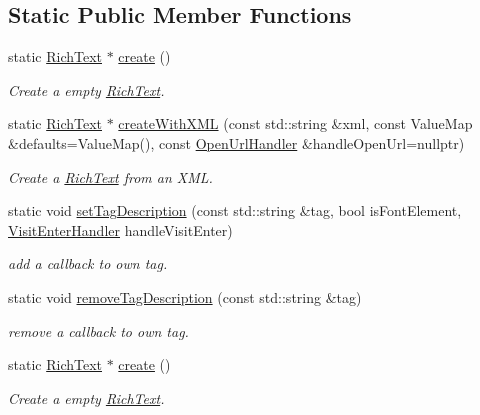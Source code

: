 \subsection*{Static Public Member Functions}
\begin{DoxyCompactItemize}
\item 
static \hyperlink{classui_1_1RichText}{Rich\+Text} $\ast$ \hyperlink{classui_1_1RichText_ae4e83215a254608fe6b26aecd224abfa}{create} ()
\begin{DoxyCompactList}\small\item\em Create a empty \hyperlink{classui_1_1RichText}{Rich\+Text}. \end{DoxyCompactList}\item 
static \hyperlink{classui_1_1RichText}{Rich\+Text} $\ast$ \hyperlink{classui_1_1RichText_a90c6d73c16d60b0f32308edb67415116}{create\+With\+X\+ML} (const std\+::string \&xml, const Value\+Map \&defaults=Value\+Map(), const \hyperlink{classui_1_1RichText_ad3631ae61d204f1d9576f5923bbd762e}{Open\+Url\+Handler} \&handle\+Open\+Url=nullptr)
\begin{DoxyCompactList}\small\item\em Create a \hyperlink{classui_1_1RichText}{Rich\+Text} from an X\+ML. \end{DoxyCompactList}\item 
static void \hyperlink{classui_1_1RichText_a421781e8515f59cf033477d77d4461f0}{set\+Tag\+Description} (const std\+::string \&tag, bool is\+Font\+Element, \hyperlink{classui_1_1RichText_a195114ba2bddc97248b8a0c400d489f7}{Visit\+Enter\+Handler} handle\+Visit\+Enter)
\begin{DoxyCompactList}\small\item\em add a callback to own tag. \end{DoxyCompactList}\item 
static void \hyperlink{classui_1_1RichText_a28cf05a1a014f4845544f3664ba4c8fb}{remove\+Tag\+Description} (const std\+::string \&tag)
\begin{DoxyCompactList}\small\item\em remove a callback to own tag. \end{DoxyCompactList}\item 
static \hyperlink{classui_1_1RichText}{Rich\+Text} $\ast$ \hyperlink{classui_1_1RichText_a67dbc7d118c0f02c9598221a3bceaf20}{create} ()
\begin{DoxyCompactList}\small\item\em Create a empty \hyperlink{classui_1_1RichText}{Rich\+Text}. \end{DoxyCompactList}\item 

\end{DoxyCompactItemize}
